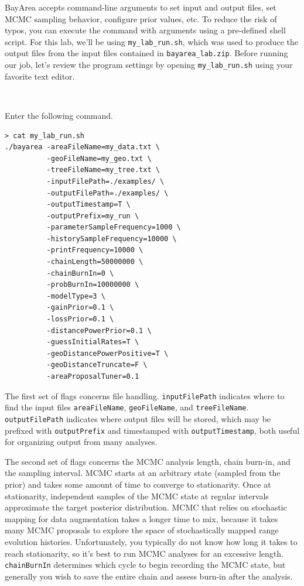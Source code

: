 \documentclass[11pt]{article}
\newcommand{\impmark}{\strut\vadjust{\domark}}
\newcommand{\domark}{%
  \vbox to 0pt{
    \kern-\dp\strutbox
    \smash{\llap{$\rightarrow$\kern1em}}
    \vss
  }%
}
\begin{document}
BayArea accepts command-line arguments to set input and output files, set MCMC sampling behavior, configure prior values, etc.
To reduce the risk of typos, you can execute the command with arguments using a pre-defined shell script.
For this lab, we'll be using \texttt{my\_lab\_run.sh}, which was used to produce the output files from the input files contained in \texttt{bayarea\_lab.zip}.
Before running our job, let's review the program settings by opening \texttt{my\_lab\_run.sh} using your favorite text editor.

\noindent \\ \impmark Enter the following command.
\begin{framed}
\begin{lstlisting}
> cat my_lab_run.sh
./bayarea -areaFileName=my_data.txt \
          -geoFileName=my_geo.txt \
          -treeFileName=my_tree.txt \
          -inputFilePath=./examples/ \
          -outputFilePath=./examples/ \
          -outputTimestamp=T \
          -outputPrefix=my_run \
          -parameterSampleFrequency=1000 \
          -historySampleFrequency=10000 \
          -printFrequency=10000 \
          -chainLength=50000000 \
          -chainBurnIn=0 \
          -probBurnIn=10000000 \
          -modelType=3 \
          -gainPrior=0.1 \
          -lossPrior=0.1 \
          -distancePowerPrior=0.1 \
          -guessInitialRates=T \
          -geoDistancePowerPositive=T \
          -geoDistanceTruncate=F \
          -areaProposalTuner=0.1
\end{lstlisting}
\end{framed}

The first set of flags concerns file handling.
\texttt{inputFilePath} indicates where to find the input files \texttt{areaFileName}, \texttt{geoFileName}, and \texttt{treeFileName}.
\texttt{outputFilePath} indicates where output files will be stored, which may be prefixed with \texttt{outputPrefix} and timestamped with \texttt{outputTimestamp}, both useful for organizing output from many analyses.

The second set of flags concerns the MCMC analysis length, chain burn-in, and the sampling interval.
MCMC starts at an arbitrary state (sampled from the prior) and takes some amount of time to converge to stationarity.
Once at stationarity, independent samples of the MCMC state at regular intervals approximate the target posterior distribution.
MCMC that relies on stochastic mapping for data augmentation takes a longer time to mix, because it takes many MCMC proposals to explore the space of stochastically mapped range evolution histories.
Unfortunately, you typically do not know how long it takes to reach stationarity, so it's best to run MCMC analyses for an excessive length.
\texttt{chainBurnIn} determines which cycle to begin recording the MCMC state, but generally you wish to save the entire chain and assess burn-in after the analysis.
\end{document}
